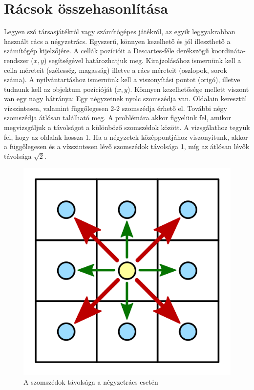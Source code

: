 
\section{Rácsok összehasonlítása}

Legyen szó társasjátékról vagy számítógépes játékról, az egyik leggyakrabban használt rács a négyzetrács. Egyszerű, könnyen kezelhető és jól illeszthető a számítógép kijelzőjére.
\newline A cellák pozícióit a Descartes-féle derékszögű koordináta-rendszer ($x, y$) segítségével határozhatjuk meg. 
\newline Kirajzolásához ismernünk kell a cella méreteit (szélesség, magasság) illetve a rács méreteit (oszlopok, sorok száma). 
\newline A nyilvántartáshoz ismernünk kell a viszonyítási pontot (origó), illetve tudnunk kell az objektum pozícióját ($x, y$).
\newline
\newline Könnyen kezelhetősége mellett viszont van egy nagy hátránya:
Egy négyzetnek nyolc szomszédja van. Oldalain keresztül vízszintesen, valamint függőlegesen 2-2 szomszédja érhető el. További négy szomszédja átlósan található meg. A problémára akkor figyelünk fel, amikor megvizsgáljuk a távolságot a különböző szomszédok között. A vizsgálathoz tegyük fel, hogy az oldalak hossza 1. Ha a négyzetek középpontjához viszonyítunk, akkor a függőlegesen és a vízszintesen lévő szomszédok távolsága 1, míg az átlósan lévők távolsága $\sqrt{2}$.
\newline

\begin{figure}[h]
\centering
\includegraphics[scale=0.2]{kepek/img21.png}
\caption{A szomszédok távolsága a négyzetrács esetén}
\label{fig:img21}
\end{figure}

